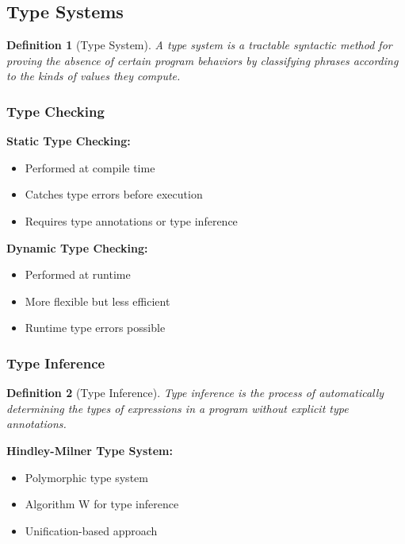 \documentclass[11pt]{article}
\newtheorem{definition}{Definition}[section]
\begin{document}
\subsection{Type Systems}

\begin{definition}[Type System]
A type system is a tractable syntactic method for proving the absence of certain program behaviors by classifying phrases according to the kinds of values they compute.
\end{definition}

\subsubsection{Type Checking}

\textbf{Static Type Checking:}
\begin{itemize}
    \item Performed at compile time
    \item Catches type errors before execution
    \item Requires type annotations or type inference
\end{itemize}

\textbf{Dynamic Type Checking:}
\begin{itemize}
    \item Performed at runtime
    \item More flexible but less efficient
    \item Runtime type errors possible
\end{itemize}

\subsubsection{Type Inference}

\begin{definition}[Type Inference]
Type inference is the process of automatically determining the types of expressions in a program without explicit type annotations.
\end{definition}

\textbf{Hindley-Milner Type System:}
\begin{itemize}
    \item Polymorphic type system
    \item Algorithm W for type inference
    \item Unification-based approach
\end{itemize}
\end{document}
